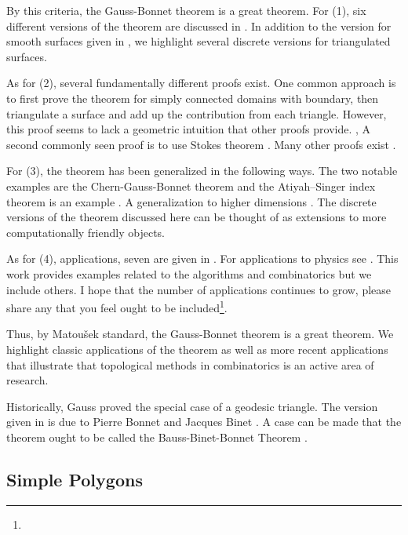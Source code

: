 By this criteria, the Gauss-Bonnet theorem is a great theorem.
For (1), six different versions of the theorem are discussed
in \cite{wu_historical_2008}. 
In addition to the version for smooth surfaces given in ,
we highlight several discrete versions for triangulated surfaces. 
 
 
 
As for (2), several fundamentally different proofs exist.  
One common approach is to first prove the theorem for simply connected domains
with boundary, then triangulate a surface and add up the contribution from each triangle.
However, this proof seems to lack a geometric intuition that other proofs provide. \cite{wu_historical_2008},
A second commonly seen proof is to use Stokes theorem  \cite{doc76,pressley_elementary_2010}.
Many other proofs exist \cite{guillemin_differential_2010,levi-bicycle,grinfeld_introduction_2013}.


For (3), the theorem has been generalized in the following ways.
The two notable examples are the Chern-Gauss-Bonnet theorem\cite{chern_simple_1944} and
the Atiyah–Singer index theorem is an example  \cite{atiyah_index_1963}.
A generalization to higher dimensions \cite{guillemin_differential_2010}.
The discrete versions of the theorem discussed here can be thought of as extensions
to more computationally friendly objects.



As for (4), applications, 
seven are given in \cite{doc76}.
For applications to physics see \cite{tirado-physics-apps,gibbons_applications_2008}.
This work provides examples related to the algorithms and combinatorics but we include
others.
I hope that the number of applications continues to grow,
please share any that you feel
ought to be included\footnote{}.

Thus, by Matou\v{s}ek standard, the Gauss-Bonnet theorem is a great theorem.
We highlight classic applications of the theorem as well as more recent
applications that illustrate that topological methods in combinatorics is an active
area of research.

Historically,  Gauss proved the special case of a geodesic triangle\cite{dombrowski-79,gauss_disquisitiones_1827}.  
The version given in  is due to Pierre Bonnet
and Jacques Binet \cite{bonnet1848memoire}. A case can be made that the theorem
ought to be called the Bauss-Binet-Bonnet Theorem
\cite{wu_historical_2008}.

\subsection{Simple Polygons}
\label{sec:warm-up}

